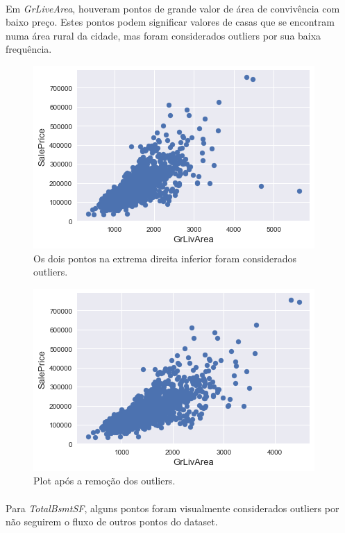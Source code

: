\documentclass{article}
\begin{document}
			\paragraph{}Em \textit{GrLiveArea}, houveram pontos de grande valor de área de convivência com baixo preço. Estes pontos podem significar valores de casas que se encontram numa área rural da cidade, mas foram considerados outliers por sua baixa frequência.
			\begin{figure}[H]
				\centering
				\includegraphics[scale=0.8]{../img/grlivearea_outliers}
				\caption{Os dois pontos na extrema direita inferior foram considerados outliers.}
			\end{figure}
		
			\begin{figure}[H]
				\centering
				\includegraphics[scale=0.8]{../img/grlivearea_no_outliers}
				\caption{Plot após a remoção dos outliers.}
			\end{figure}
			
			\paragraph{}Para \textit{TotalBsmtSF}, alguns pontos foram visualmente considerados outliers por não seguirem o fluxo de outros pontos do dataset.
			
\end{document}
